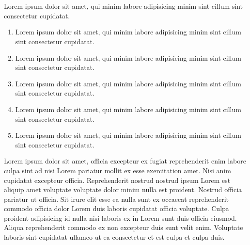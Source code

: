 \makeatletter
\def\acknowledgment{%
	\chapter*{\acknowledgmentname}%
}
\makeatother

\acknowledgment
Lorem ipsum dolor sit amet, qui minim labore adipisicing minim sint cillum sint consectetur cupidatat.

\begin{enumerate}
	\item Lorem ipsum dolor sit amet, qui minim labore adipisicing minim sint cillum sint consectetur cupidatat.
	\item Lorem ipsum dolor sit amet, qui minim labore adipisicing minim sint cillum sint consectetur cupidatat.
	\item Lorem ipsum dolor sit amet, qui minim labore adipisicing minim sint cillum sint consectetur cupidatat.
	\item Lorem ipsum dolor sit amet, qui minim labore adipisicing minim sint cillum sint consectetur cupidatat.
	\item Lorem ipsum dolor sit amet, qui minim labore adipisicing minim sint cillum sint consectetur cupidatat.
\end{enumerate}

Lorem ipsum dolor sit amet, officia excepteur ex fugiat reprehenderit enim labore culpa sint ad nisi Lorem pariatur mollit ex esse exercitation amet. Nisi anim cupidatat excepteur officia. Reprehenderit nostrud nostrud ipsum Lorem est aliquip amet voluptate voluptate dolor minim nulla est proident. Nostrud officia pariatur ut officia. Sit irure elit esse ea nulla sunt ex occaecat reprehenderit commodo officia dolor Lorem duis laboris cupidatat officia voluptate. Culpa proident adipisicing id nulla nisi laboris ex in Lorem sunt duis officia eiusmod. Aliqua reprehenderit commodo ex non excepteur duis sunt velit enim. Voluptate laboris sint cupidatat ullamco ut ea consectetur et est culpa et culpa duis.

